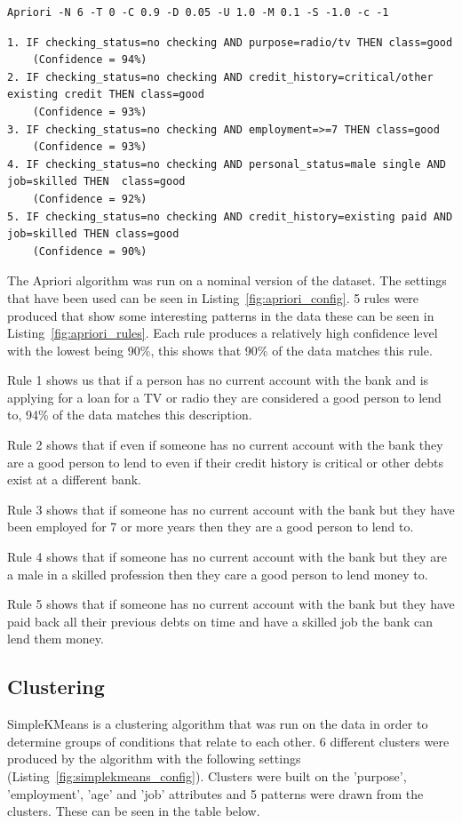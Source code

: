 \documentclass[12pt]{article}
\begin{document}
\begin{lstlisting}[caption="Apriori configuration"\label{fig:apriori_config}]
Apriori -N 6 -T 0 -C 0.9 -D 0.05 -U 1.0 -M 0.1 -S -1.0 -c -1
\end{lstlisting}
\begin{lstlisting}[caption="Apriori rules"\label{fig:apriori_rules}]
1. IF checking_status=no checking AND purpose=radio/tv THEN class=good 
    (Confidence = 94%)
2. IF checking_status=no checking AND credit_history=critical/other existing credit THEN class=good 
    (Confidence = 93%)
3. IF checking_status=no checking AND employment=>=7 THEN class=good 
    (Confidence = 93%)
4. IF checking_status=no checking AND personal_status=male single AND job=skilled THEN  class=good 
    (Confidence = 92%)
5. IF checking_status=no checking AND credit_history=existing paid AND job=skilled THEN class=good 
    (Confidence = 90%)

\end{lstlisting}
The Apriori algorithm was run on a nominal version of the dataset. The settings that have been used can be seen in Listing~\ref{fig:apriori_config}. 5 rules were produced that show some interesting patterns in the data these can be seen in Listing~\ref{fig:apriori_rules}. Each rule produces a relatively high confidence level with the lowest being 90\%, this shows that 90\% of the data matches this rule. 

Rule 1 shows us that if a person has no current account with the bank and is applying for a loan for a TV or radio they are considered a good person to lend to, 94\% of the data matches this description.

Rule 2 shows that if even if someone has no current account with the bank they are a good person to lend to even if their credit history is critical or other debts exist at a different bank.

Rule 3 shows that if someone has no current account with the bank but they have been employed for 7 or more years then they are a good person to lend to.

Rule 4 shows that if someone has no current account with the bank but they are a male in a skilled profession then they care a good person to lend money to.

Rule 5 shows that if someone has no current account with the bank but they have paid back all their previous debts on time and have a skilled job the bank can lend them money.

\subsection{Clustering}
SimpleKMeans is a clustering algorithm that was run on the data in order to determine groups of conditions that relate to each other. 6 different clusters were produced by the algorithm with the following settings (Listing~\ref{fig:simplekmeans_config}). Clusters were built on the 'purpose', 'employment', 'age' and 'job' attributes and 5 patterns were drawn from the clusters. These can be seen in the table below.
\end{document}
